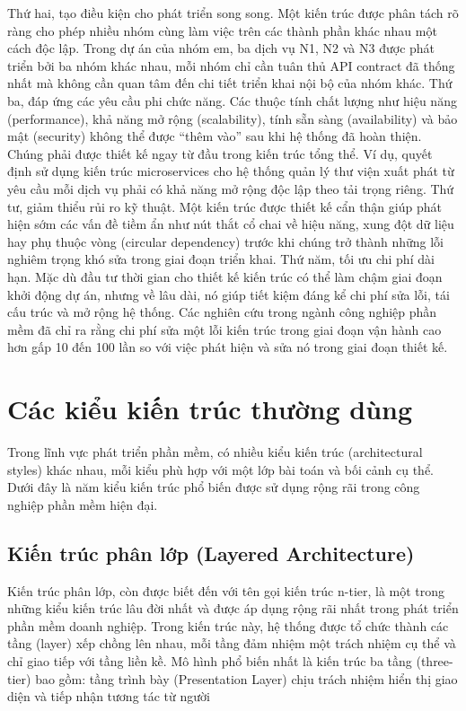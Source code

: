 Thứ hai, tạo điều kiện cho phát triển song song. Một kiến trúc được phân tách rõ ràng cho phép nhiều nhóm cùng làm việc trên các thành phần khác nhau một cách độc lập. Trong dự án của nhóm em, ba dịch vụ N1, N2 và N3 được phát triển bởi ba nhóm khác nhau, mỗi nhóm chỉ cần tuân thủ API contract đã thống nhất mà không cần quan tâm đến chi tiết triển khai nội bộ của nhóm khác. Thứ ba, đáp ứng các yêu cầu phi chức năng. Các thuộc tính chất lượng như hiệu năng (performance), khả năng mở rộng (scalability), tính sẵn sàng (availability) và bảo mật (security) không thể được “thêm vào” sau khi hệ thống đã hoàn thiện. Chúng phải được thiết kế ngay từ đầu trong kiến trúc tổng thể. Ví dụ, quyết định sử dụng kiến trúc microservices cho hệ thống quản lý thư viện xuất phát từ yêu cầu mỗi dịch vụ phải có khả năng mở rộng độc lập theo tải trọng riêng. Thứ tư, giảm thiểu rủi ro kỹ thuật. Một kiến trúc được thiết kế cẩn thận giúp phát hiện sớm các vấn đề tiềm ẩn như nút thắt cổ chai về hiệu năng, xung đột dữ liệu hay phụ thuộc vòng (circular dependency) trước khi chúng trở thành những lỗi nghiêm trọng khó sửa trong giai đoạn triển khai. Thứ năm, tối ưu chi phí dài hạn. Mặc dù đầu tư thời gian cho thiết kế kiến trúc có thể làm chậm giai đoạn khởi động dự án, nhưng về lâu dài, nó giúp tiết kiệm đáng kể chi phí sửa lỗi, tái cấu trúc và mở rộng hệ thống. Các nghiên cứu trong ngành công nghiệp phần mềm đã chỉ ra rằng chi phí sửa một lỗi kiến trúc trong giai đoạn vận hành cao hơn gấp 10 đến 100 lần so với việc phát hiện và sửa nó trong giai đoạn thiết kế.

\section{Các kiểu kiến trúc thường dùng}

Trong lĩnh vực phát triển phần mềm, có nhiều kiểu kiến trúc (architectural styles) khác nhau, mỗi kiểu phù hợp với một lớp bài toán và bối cảnh cụ thể. Dưới đây là năm kiểu kiến trúc phổ biến được sử dụng rộng rãi trong công nghiệp phần mềm hiện đại.

\subsection{Kiến trúc phân lớp (Layered Architecture)}

Kiến trúc phân lớp, còn được biết đến với tên gọi kiến trúc n-tier, là một trong những kiểu kiến trúc lâu đời nhất và được áp dụng rộng rãi nhất trong phát triển phần mềm doanh nghiệp. Trong kiến trúc này, hệ thống được tổ chức thành các tầng (layer) xếp chồng lên nhau, mỗi tầng đảm nhiệm một trách nhiệm cụ thể và chỉ giao tiếp với tầng liền kề. Mô hình phổ biến nhất là kiến trúc ba tầng (three-tier) bao gồm: tầng trình bày (Presentation Layer) chịu trách nhiệm hiển thị giao diện và tiếp nhận tương tác từ người

